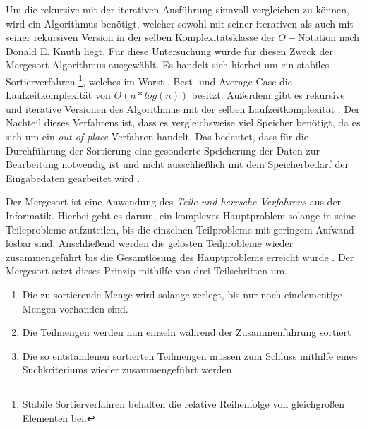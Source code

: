 Um die rekursive mit der iterativen Ausführung  sinnvoll vergleichen zu können, wird ein Algorithmus benötigt, welcher sowohl mit seiner iterativen als auch mit seiner rekursiven Version in der selben Komplexitätsklasse  der $O-$Notation nach  Donald E. Knuth liegt. Für diese Untersuchung wurde für diesen Zweck der Mergesort Algorithmus ausgewählt. Es handelt sich hierbei um ein stabiles Sortierverfahren \footnote{Stabile Sortierverfahren behalten die relative Reihenfolge von gleichgroßen Elementen bei.}, welches im Worst-, Best- und Average-Case die Laufzeitkomplexität von $O(n*log(n))$ besitzt. Außerdem gibt es rekursive und iterative Versionen des Algorithmus mit der selben Laufzeitkomplexität \cite[134, 135]{AlgorithmenJurgen}. Der Nachteil dieses Verfahrens ist, dass es vergleichsweise viel Speicher benötigt, da es sich um ein \emph{out-of-place} Verfahren handelt. Das bedeutet, dass für die Durchführung der Sortierung eine gesonderte Speicherung der Daten zur Bearbeitung notwendig ist und nicht ausschließlich mit dem Speicherbedarf der Eingabedaten gearbeitet wird .

Der Mergesort ist eine Anwendung des \emph{Teile und herrsche Verfahrens} aus der Informatik. Hierbei geht es darum, ein komplexes Hauptproblem solange in seine Teileprobleme aufzuteilen, bis die einzelnen Teilprobleme mit geringem Aufwand lösbar sind. Anschließend werden die gelösten Teilprobleme wieder zusammengeführt bis die Gesamtlösung des Hauptproblems erreicht wurde . Der Mergesort setzt dieses Prinzip mithilfe von drei Teilschritten um.
\begin{enumerate}
\item Die zu sortierende Menge wird solange zerlegt, bis nur noch einelementige Mengen vorhanden sind.
\item Die Teilmengen werden nun einzeln während der Zusammenführung sortiert
\item Die so entstandenen sortierten Teilmengen müssen zum Schluss mithilfe eines Suchkriteriums wieder zusammengeführt werden 
\end{enumerate}

